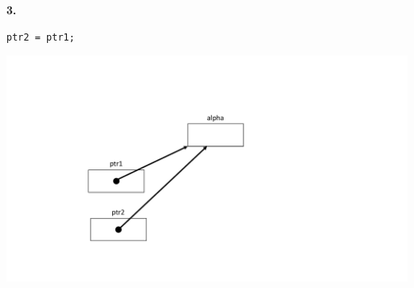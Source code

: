 \Large{\textbf{3.}}\normalsize\\
\noindent
\begin{minipage}{0.25\linewidth}
\begin{lstlisting}
ptr2 = ptr1;
\end{lstlisting}
\end{minipage}
\hspace{0.01\linewidth}
\begin{minipage}{0.4\linewidth}
	\centering
	\includegraphics[width=\linewidth]{images/pointer6.pdf}
\end{minipage}


